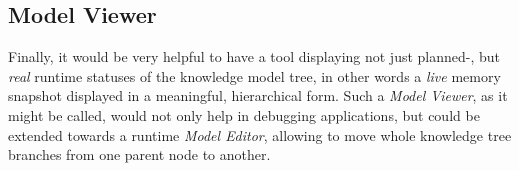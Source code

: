 %
%
%
%
%
%
%

\subsection{Model Viewer}
\label{model_viewer_heading}

Finally, it would be very helpful to have a tool displaying not just planned-,
but \emph{real} runtime statuses of the knowledge model tree, in other words a
\emph{live} memory snapshot displayed in a meaningful, hierarchical form. Such
a \emph{Model Viewer}, as it might be called, would not only help in debugging
applications, but could be extended towards a runtime \emph{Model Editor},
allowing to move whole knowledge tree branches from one parent node to another.
